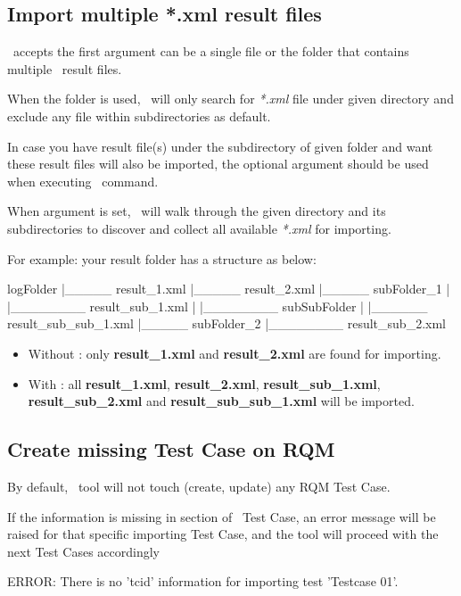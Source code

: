 \subsection{Import multiple *.xml result files}
\pkg\ accepts the first argument  can be a single file or
the folder that contains multiple \rfwcore\ result files.

When the folder is used, \pkg\ will only search for \emph{*.xml} file under
given directory and exclude any file within subdirectories as default.

In case you have result file(s) under the subdirectory of given folder and want
these result files will also be imported, the optional argument
 should be used when executing \pkg\ command.

When  argument is set, \pkg\ will walk through the given
directory and its subdirectories to discover and collect all available
\emph{*.xml} for importing.

For example: your result folder has a structure as below:

\begin{robotlog}
logFolder
  |_____ result_1.xml
  |_____ result_2.xml
  |_____ subFolder_1
  |     |________ result_sub_1.xml
  |     |________ subSubFolder
  |            |______ result_sub_sub_1.xml
  |_____ subFolder_2
       |________ result_sub_2.xml
\end{robotlog}

\begin{itemize}
\item Without : only \textbf{result\_1.xml} and
    \textbf{result\_2.xml} are found for importing.
\item With : all \textbf{result\_1.xml},
    \textbf{result\_2.xml}, \textbf{result\_sub\_1.xml},
    \textbf{result\_sub\_2.xml} and \textbf{result\_sub\_sub\_1.xml} will
    be imported.
\end{itemize}

\subsection{Create missing Test Case on RQM}
By default, \pkg\ tool will not touch (create, update) any RQM Test Case.

If the  information is missing in \rcode{[Tags]} section of
\rfwcore\ Test Case, an error message will be raised for that specific importing
Test Case, and the tool will proceed with the next Test Cases accordingly
\begin{pythonlog}
ERROR: There is no 'tcid' information for importing test 'Testcase 01'.
\end{pythonlog}


